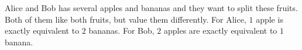 \documentclass[addpoints,answers]{exam}
\begin{document}
    \pagestyle{headandfoot}
    \runningheadrule

    \firstpagefooter{}{}{}
    \runningfooter{}{}{}
    \begin{flushright}

        \vspace{0.2in}

    \end{flushright}

    \begin{questions}
        \question
            Alice and Bob has several apples and bananas and they want to split these
            fruits. Both of them like both fruits, but value them differently. For Alice,
            $1$ apple is exactly equivalent to $2$ bananas. For Bob, $2$ apples are exactly
            equivalent to $1$ banana.
            

\end{questions}
\end{document}
